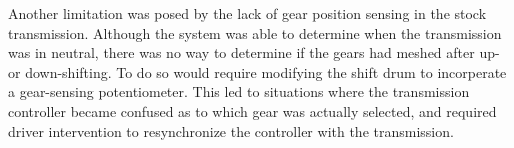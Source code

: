 Another limitation was posed by the lack of gear position sensing in the stock transmission. Although the system was able to determine when the transmission was in neutral, there was no way to determine if the gears had meshed after up- or down-shifting. To do so would require modifying the shift drum to incorperate a gear-sensing potentiometer. This led to situations where the transmission controller became confused as to which gear was actually selected, and required driver intervention to resynchronize the controller with the transmission.
